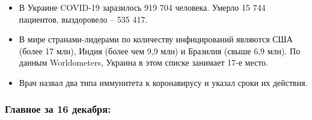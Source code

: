 \begin{itemize}
\item В Украине COVID-19 заразилось 919 704 человека. Умерло 15 744 пациентов, выздоровело – 535 417.

\item В мире странами-лидерами по количеству инфицирований являются США (более
				17 млн), Индия (более чем 9,9 млн) и Бразилия (свыше 6,9 млн). По
				данным Worldometers, Украина в этом списке занимает 17-е место.

\item Врач назвал два типа иммунитета к коронавирусу и указал сроки их действия.
\end{itemize}

\subsubsection{Главное за 16 декабря:}


